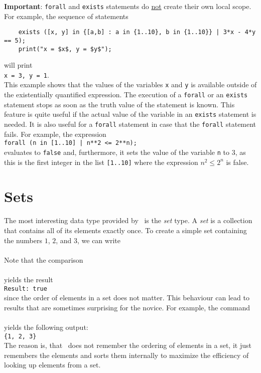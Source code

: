 \noindent
\textbf{Important}:  \texttt{forall} and \texttt{exists} statements do \underline{not}
create their own local scope.  For example, the sequence of statements
\begin{verbatim}
    exists ([x, y] in {[a,b] : a in {1..10}, b in {1..10}} | 3*x - 4*y == 5);
    print("x = $x$, y = $y$");
\end{verbatim}
will print
\\[0.2cm]
\hspace*{1.3cm}
\texttt{x = 3, y = 1}.
\\[0.2cm]
This example shows that the values of the variables \texttt{x} and \texttt{y} is available
outside of the existentially quantified expression.  The execution of
a \texttt{forall} or an \texttt{exists} statement stops as soon as the
truth value of the statement is known.
This feature is quite useful if the actual value of the variable in an \texttt{exists}
statement is needed.  It is also useful for a \texttt{forall} statement in case that the
\texttt{forall} statement fails.  For example, the expression
\\[0.2cm]
\hspace*{1.3cm}
\texttt{forall (n in [1..10] | n**2 <= 2**n);}
\\[0.2cm]
evaluates to \texttt{false} and, furthermore, it sets the value of the variable \texttt{n}
to $3$, as this is the first integer in the list \texttt{[1..10]}
where the expression $n^2 \leq 2^n$ is false.

\section{Sets}
The most interesting data type provided by \setlx\ is the \emph{set} type.  A \emph{set} is
a collection that contains all of its elements exactly once.
To create a
simple set containing the numbers $1$, $2$, and $3$, we can write
\\[0.2cm]
\hspace*{1.3cm}
\\[0.2cm]
Note that the comparison
\\[0.2cm]
\hspace*{1.3cm}
\\[0.2cm]
yields the result
\\[0.2cm]
\hspace*{1.3cm}
\texttt{Result: true}
\\[0.2cm]
since the order of elements in a set does not matter.  This behaviour can lead to
results that are sometimes surprising for the novice.  For example, the command
\\[0.2cm]
\hspace*{1.3cm}
\\[0.2cm]
yields the following output:
\\[0.2cm]
\hspace*{1.3cm}
\texttt{\{1, 2, 3\}}
\\[0.2cm]
The reason is, that \setlx\ does not remember the ordering of elements in a set, it just
remembers the elements and sorts them internally to maximize the efficiency of looking up
elements from a set.  

